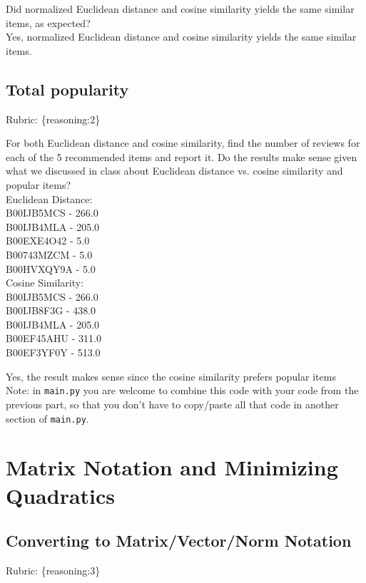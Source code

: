 \documentclass{article}
\def\rubric#1{\gre{Rubric: \{#1\}}}{}
\def\blu#1{{\color{blu}#1}}
\def\gre#1{{\color{gre}#1}}
\def\red#1{{\color{red}#1}}
\begin{document}
\blu{Did normalized Euclidean distance and cosine similarity yields the same similar items, as expected?} \\
\red{Yes, normalized Euclidean distance and cosine similarity yields the same similar items.}


\subsection{Total popularity}
\rubric{reasoning:2}

\blu{For both Euclidean distance and cosine similarity, find the number of reviews for each of the 5 recommended items and report it. Do the results make sense given what we discussed in class about Euclidean distance vs. cosine similarity and popular items?} \\
\red{Euclidean Distance: \\
B00IJB5MCS  -  266.0  \\
B00IJB4MLA  -  205.0 \\
B00EXE4O42  -  5.0 \\
B00743MZCM  -  5.0 \\
B00HVXQY9A  -  5.0 
} \\

\red{Cosine Similarity: \\
B00IJB5MCS  -  266.0 \\
B00IJB8F3G  -  438.0 \\
B00IJB4MLA  -  205.0 \\
B00EF45AHU  -  311.0 \\
B00EF3YF0Y  -  513.0}

\gre{Yes, the result makes sense since the cosine similarity prefers popular items} \\
Note: in \texttt{main.py} you are welcome to combine this code with your code from the previous part, so that you don't have to copy/paste all that code in another section of \texttt{main.py}.


\section{Matrix Notation and Minimizing Quadratics}


\subsection{Converting to Matrix/Vector/Norm Notation}
\rubric{reasoning:3}
\end{document}

